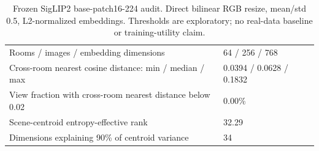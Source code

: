 \begin{table}[ht]
\centering\small
\begin{tabular}{p{.53\linewidth}p{.36\linewidth}}
\toprule
Rooms / images / embedding dimensions & 64 / 256 / 768 \\
Cross-room nearest cosine distance: min / median / max & 0.0394 / 0.0628 / 0.1832 \\
View fraction with cross-room nearest distance below 0.02 & 0.00\% \\
Scene-centroid entropy-effective rank & 32.29 \\
Dimensions explaining 90\% of centroid variance & 34 \\
\bottomrule
\end{tabular}
\caption{Frozen SigLIP2 base-patch16-224 audit. Direct bilinear RGB resize, mean/std 0.5, L2-normalized embeddings. Thresholds are exploratory; no real-data baseline or training-utility claim.}\label{tab:embedding}
\end{table}
